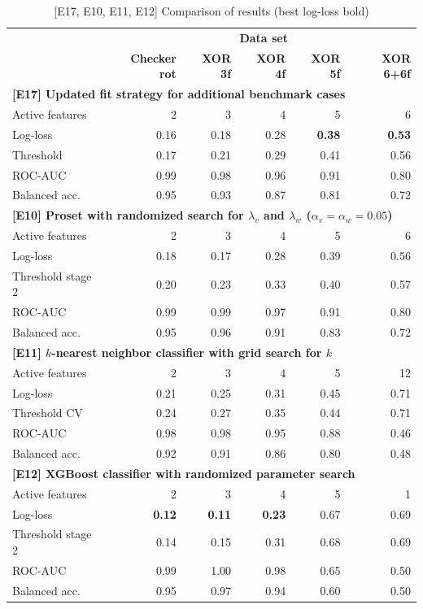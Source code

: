\begin{table}
\caption{[E17, E10, E11, E12] Comparison of results (best log-loss bold)}
\label{tab_e17_e10_e11_e12}
%
\begin{center}
\small
\begin{tabular}{|lrrrrr|}
\hline
&\multicolumn{5}{c|}{\textbf{\hrulefill\ Data set \hrulefill}}\\
&\textbf{Checker rot}&\textbf{XOR 3f}&\textbf{XOR 4f}&\textbf{XOR 5f}&\textbf{XOR 6+6f}\\
\multicolumn{6}{|l|}{\textbf{[E17] Updated fit strategy for additional benchmark cases}}\\
Active features&2&3&4&5&6\\
Log-loss&0.16&0.18&0.28&\textbf{0.38}&\textbf{0.53}\\
Threshold&0.17&0.21&0.29&0.41&0.56\\
ROC-AUC&0.99&0.98&0.96&0.91&0.80\\
Balanced acc.&0.95&0.93&0.87&0.81&0.72\\
\multicolumn{6}{|l|}{\textbf{[E10] Proset with randomized search for $\lambda_v$ and $\lambda_w$ ($\alpha_v=\alpha_w=0.05$)}}\\
Active features&2&3&4&5&6\\
Log-loss&0.18&0.17&0.28&0.39&0.56\\
Threshold stage 2&0.20&0.23&0.33&0.40&0.57\\
ROC-AUC&0.99&0.99&0.97&0.91&0.80\\
Balanced acc.&0.95&0.96&0.91&0.83&0.72\\
\multicolumn{6}{|l|}{\textbf{[E11] $k$-nearest neighbor classifier with grid search for $k$}}\\
Active features&2&3&4&5&12\\
Log-loss&0.21&0.25&0.31&0.45&0.71\\
Threshold CV&0.24&0.27&0.35&0.44&0.71\\
ROC-AUC&0.98&0.98&0.95&0.88&0.46\\
Balanced acc.&0.92&0.91&0.86&0.80&0.48\\
\multicolumn{6}{|l|}{\textbf{[E12] XGBoost classifier with randomized parameter search}}\\
Active features&2&3&4&5&1\\
Log-loss&\textbf{0.12}&\textbf{0.11}&\textbf{0.23}&0.67&0.69\\
Threshold stage 2&0.14&0.15&0.31&0.68&0.69\\
ROC-AUC&0.99&1.00&0.98&0.65&0.50\\
Balanced acc.&0.95&0.97&0.94&0.60&0.50\\
\hline
\end{tabular}
\end{center}
\end{table}
